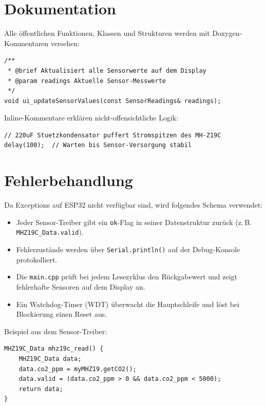 \documentclass[a4paper,11pt]{article}
\begin{document}
\section{Dokumentation}

Alle öffentlichen Funktionen, Klassen und Strukturen werden mit Doxygen-Kommentaren versehen:

\begin{lstlisting}
/**
 * @brief Aktualisiert alle Sensorwerte auf dem Display
 * @param readings Aktuelle Sensor-Messwerte
 */
void ui_updateSensorValues(const SensorReadings& readings);
\end{lstlisting}

Inline-Kommentare erklären nicht-offensichtliche Logik:
\begin{lstlisting}
// 220uF Stuetzkondensator puffert Stromspitzen des MH-Z19C
delay(100);  // Warten bis Sensor-Versorgung stabil
\end{lstlisting}

\section{Fehlerbehandlung}

Da Exceptions auf ESP32 nicht verfügbar sind, wird folgendes Schema verwendet:

\begin{itemize}[nosep]
\item Jeder Sensor-Treiber gibt ein \texttt{ok}-Flag in seiner Datenstruktur zurück (z.\,B. \texttt{MHZ19C\_Data.valid}).
\item Fehlerzustände werden über \texttt{Serial.println()} auf der Debug-Konsole protokolliert.
\item Die \texttt{main.cpp} prüft bei jedem Lesezyklus den Rückgabewert und zeigt fehlerhafte Sensoren auf dem Display an.
\item Ein Watchdog-Timer (WDT) überwacht die Hauptschleife und löst bei Blockierung einen Reset aus.
\end{itemize}

Beispiel aus dem Sensor-Treiber:
\begin{lstlisting}
MHZ19C_Data mhz19c_read() {
    MHZ19C_Data data;
    data.co2_ppm = myMHZ19.getCO2();
    data.valid = (data.co2_ppm > 0 && data.co2_ppm < 5000);
    return data;
}
\end{lstlisting}
\end{document}
